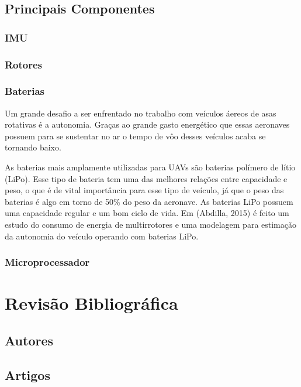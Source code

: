 \subsection{Principais Componentes}

\subsubsection{IMU}

\subsubsection{Rotores}

\subsubsection{Baterias}

Um grande desafio a ser enfrentado no trabalho com veículos áereos de asas rotativas é a autonomia. Graças ao grande gasto energético que essas aeronaves possuem para se sustentar no ar o tempo de vôo desses veículos acaba se tornando baixo.   

As baterias mais amplamente utilizadas para UAVs são baterias polímero de lítio (LiPo). Esse tipo de bateria tem uma das melhores relações entre capacidade e peso, o que é de vital importância para esse tipo de veículo, já que o peso das baterias é algo em torno de 50\% do peso da aeronave. As baterias LiPo possuem uma capacidade regular e um bom ciclo de vida. Em (Abdilla, 2015) é feito um estudo do consumo de energia de multirrotores e uma modelagem para estimação da autonomia do veículo operando com baterias LiPo.  

\subsubsection{Microprocessador}

\section{Revisão Bibliográfica}
\subsection{Autores}
\subsection{Artigos}

